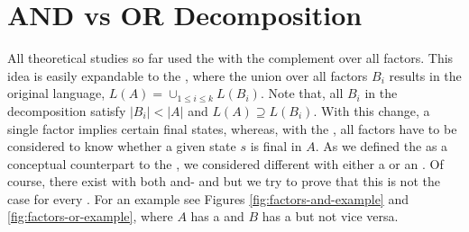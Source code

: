 \chapter{AND vs OR Decomposition}
\label{chap:and-vs-or}
All theoretical studies so far used the \andDecomp with the complement over all factors.
This idea is easily expandable to the \orDecomp, where the union over all factors $B_i$ results in the original language, $L(A) = \cup_{1\leq i \leq k} L(B_i)$.
Note that, all $B_i$ in the decomposition satisfy $|B_i| < |A|$ and $L(A) \supseteq L(B_i)$.
With this change, a single factor implies certain final states, whereas, with the \andDecomp, all factors have to be considered to know whether a given state $s$ is final in $A$.
As we defined the \orDecomp as a conceptual counterpart to the \andDecomp, we considered different \DFAs with either a \andDecomp or an \orDecomp.
Of course, there exist \DFAs with both and- and \orDecomp but we try to prove that this is not the case for every \DFA.
For an example see Figures \ref{fig:factors-and-example} and \ref{fig:factors-or-example}, where $A$ has a \andDecomp and $B$ has a \orDecomp but not vice versa.

